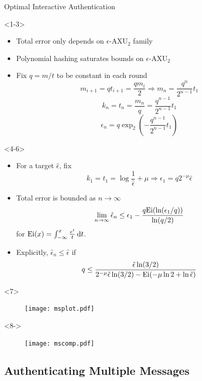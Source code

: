 \documentclass[xcolor=dvipsnames]{beamer}
\newcommand{\?}{\mathrel{?}} %
\newcommand{\dif}{\mathop{}\!\mathrm{d}} %
\newcommand{\AXU}{\mathrm{AXU}_{2}}
\newcommand{\eAXU}{\epsilon\text{-}\AXU}
\begin{document}
\begin{frame}{Optimal Interactive Authentication}
  \begin{onlyenv}<1-3>
    \begin{itemize}[<+->]
      \item Total error only depends on \(\eAXU\) family
      \item Polynomial hashing saturates bounds on \(\eAXU\)
      \item Fix \(q = m/t\) to be constant in each round
        \[ m_{i+1} = qt_{i+1} = \frac{qm_i}{2} \Rightarrow m_n = \frac{q^n}{2^{n-1}} t_1 \]
        \[ k_n = t_n = \frac{m_n}{q} = \frac{q^{n-1}}{2^{n-1}} t_1 \]
        \[ \epsilon_n = q \exp_2 \left( -\frac{q^{n-1}}{2^{n-1}} t_1 \right) \]
    \end{itemize}
  \end{onlyenv}
  \begin{onlyenv}<4-6>
    \begin{itemize}[<+->]
      \item For a target \(\hat{\epsilon}\), fix
        \[ k_1 = t_1 = \log \frac{1}{\hat{\epsilon}} + \mu \Rightarrow \epsilon_1 = q 2^{-\mu} \hat{\epsilon} \]
      \item Total error is bounded as \(n \to \infty\)
        \[ \lim_{n \to \infty} \hat{\epsilon}_n \leq  \epsilon_1 - \frac{q{\rm Ei}(\ln (\epsilon_1/q) )}{\ln (q/2)} \]
        for \(\Ei(x) = \int_{-\infty}^{x} \frac{e^{t}}{t} \dif{t}\).
      \item Explicitly, \(\hat{\epsilon}_n \leq \hat{\epsilon}\) if
        \[ q \leq \frac{\hat{\epsilon} \ln (3/2)}{2^{-\mu} \hat{\epsilon} \ln (3/2) - {\rm Ei}(-\mu \ln 2 + \ln \hat{\epsilon})} \]
    \end{itemize}
  \end{onlyenv}

  \begin{onlyenv}<7>
    \begin{figure}
      \texttt{[image: msplot.pdf]}
    \end{figure}
  \end{onlyenv}

  \begin{onlyenv}<8->
    \begin{figure}
      \texttt{[image: mscomp.pdf]}
    \end{figure}
  \end{onlyenv}
\end{frame}

\subsection{Authenticating Multiple Messages}
\end{document}

